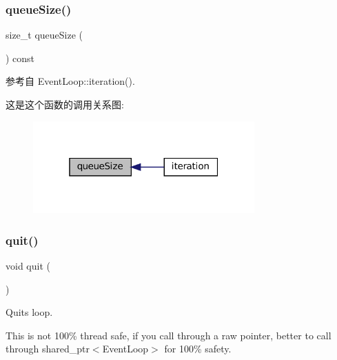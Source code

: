 \subsubsection{\texorpdfstring{queue\+Size()}{queueSize()}}
{\footnotesize\ttfamily size\+\_\+t queue\+Size (\begin{DoxyParamCaption}{ }\end{DoxyParamCaption}) const}



参考自 Event\+Loop\+::iteration().

这是这个函数的调用关系图\+:
\nopagebreak
\begin{figure}[H]
\begin{center}
\leavevmode
\includegraphics[width=241pt]{classmuduo_1_1net_1_1EventLoop_a0eff42734d64323acbd2e676bcd27b76_icgraph}
\end{center}
\end{figure}
\mbox{\label{classmuduo_1_1net_1_1EventLoop_a2463a3acef2df4c951ce942a3229e44e}} 
\subsubsection{\texorpdfstring{quit()}{quit()}}
{\footnotesize\ttfamily void quit (\begin{DoxyParamCaption}{ }\end{DoxyParamCaption})}

Quits loop.

This is not 100\% thread safe, if you call through a raw pointer, better to call through shared\+\_\+ptr$<$\+Event\+Loop$>$ for 100\% safety. \mbox{\label{classmuduo_1_1net_1_1EventLoop_ab10f76c92cb5269f8296e5b3e4dd0ef9}} 
